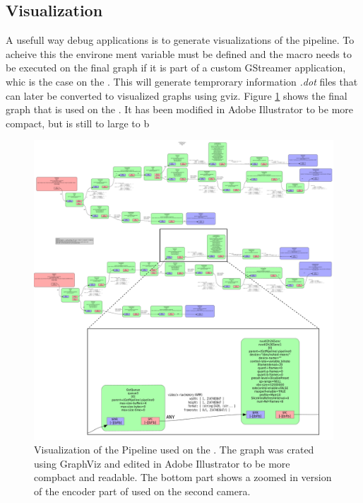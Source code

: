 \subsection{Visualization}
A usefull way debug \gs applications is to generate visualizations of the pipeline.
To acheive this the environe ment variable  must be defined and the  macro needs to be executed on the final graph if it is part of a custom GStreamer application, whic is the case on the \sr.
\cite{johnstonGeneratingGStreamerPipeline2018}
This will generate temprorary information \textit{.dot} files that can later be converted to visualized graphs using \gls{gviz}.
Figure \ref{fig:gs_pipeline_visualization} shows the final graph that is used on the \sr.
It has been modified in Adobe Illustrator to be more compact, but is still to large to b


\begin{figure}[H]
    \centering
    \includegraphics[width=\textwidth]{figures/pipeline.pdf}
    \caption{Visualization of the \gs Pipeline used on the \sr.
        The graph was crated using GraphViz and edited in Adobe Illustrator to be more compbact and readable. The bottom part shows a zoomed in version of the encoder part of used on the second camera.}
    \label{fig:gs_pipeline_visualization}
\end{figure}